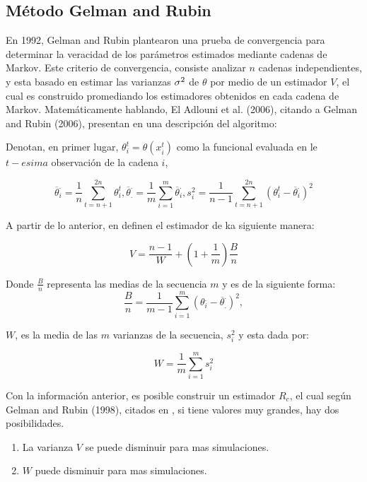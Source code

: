 \subsection{Método Gelman and Rubin}

En 1992, Gelman and Rubin plantearon una prueba de convergencia para determinar la veracidad de los parámetros estimados mediante cadenas de Markov. Este criterio de convergencia, consiste analizar $n$ cadenas independientes, 
y esta basado en estimar las varianzas $\sigma ^2 $ de $\theta$ por medio de un estimador $V$, el cual es construido promediando los estimadores obtenidos en cada cadena de Markov. Matemáticamente hablando, El Adlouni et al. (2006), citando a Gelman and Rubin (2006), presentan en \cite{adlouni} una descripción del algoritmo: 

Denotan, en primer lugar, $\theta_i^t=\theta(x_i^t)$ como la funcional evaluada en le $t-esima$ observación de la cadena $i$,

\begin{equation}
\overline{\theta}_i^{.}=\frac{1}{n}\sum_{t=n+1}^{2n} \theta_i^t , \overline{\theta}_{.}^{.}=\frac{1}{m} \sum_{i=1}^m \overline{\theta}_i^{.}, s_i^2=\frac{1}{n-1} \sum_{t=n+1}^{2n}(\theta_i^t-\overline{\theta}_i^{.})^2
\end{equation}

A partir de lo anterior, en \cite{adlouni} definen el estimador de ka siguiente manera: 

\begin{equation}
V=\frac{n-1}{W}+\left(1+\frac{1}{m}\right)\frac{B}{n}
\end{equation}

Donde $\frac{B}{n}$ representa las medias de la secuencia $m$ y es de la siguiente forma: 
\begin{equation}
\frac{B}{n}=\frac{1}{m-1}\sum_{i=1}^m(\theta_i^{.}-\overline{\theta}_{.}^{.})^2,
\end{equation}

$W$, es la media de las $m$ varianzas de la secuencia, $s_i^2$ y esta dada por: 

\begin{equation}
W=\frac{1}{m}\sum_{i=1}^m s_i^2
\end{equation} 

Con la información anterior, es posible construir un estimador $R_c$, el cual según Gelman and Rubin (1998), citados en \cite{adlouni}, si tiene valores muy grandes, hay dos posibilidades. 

\begin{enumerate}
\item La varianza $V$ se puede disminuir para mas simulaciones. 

\item $W$ puede disminuir para mas simulaciones. 
\end{enumerate}

